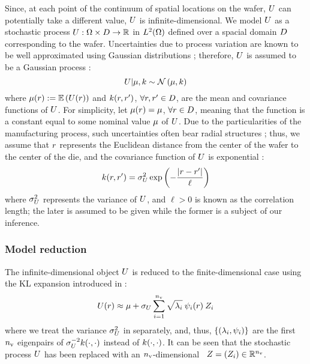 Since, at each point of the continuum of spatial locations on the wafer, $U$ can potentially take a different value, $U$ is infinite-dimensional. We model $U$ as a stochastic process $U: \Omega \times D \to \mathbb{R}$ in ${L^{2}(\Omega)}$ defined over a spacial domain $D$ corresponding to the wafer. Uncertainties due to process variation are known to be well approximated using Gaussian distributions \cite{srivastava2010}; therefore, $U$ is assumed to be a Gaussian process \cite{rasmussen2006}:
\[
  \U | \fMean, \fCov \sim \gaussian{\fMean}{\fCov}
\]
where $\fMean{\r} := \E{\U(\r)}$ and $\fCov{\r, \r'}$, $\forall r, r' \in D$, are the mean and covariance functions of $U$. For simplicity, let $\fMean{\r} = \fMean$, $\forall r \in D$, meaning that the function is a constant equal to some nominal value $\fMean$ of $U$. Due to the particularities of the manufacturing process, such uncertainties often bear radial structures \cite{cheng2011}; thus, we assume that $r$ represents the Euclidean distance from the center of the wafer to the center of the die, and the covariance function of $U$ is exponential \cite{maitre2010}:
\begin{equation} \elabel{covariance-function}
  \fCov{\r, \r'} = \sigma_\U^2 \exp\left(-\frac{\abs{\r - \r'}}{\ell}\right)
\end{equation}
where $\sigma_U^2$ represents the variance of $U$, and $\ell > 0$ is known as the correlation length; the later is assumed to be given while the former is a subject of our inference.

\subsubsection{Model reduction}
The infinite-dimensional object $U$ is reduced to the finite-dimensional case using the KL expansion introduced in :
\begin{equation} \elabel{kl-approximation}
  \U(\r) \approx \fMean + \sigma_\U \sum_{i = 1}^\nvars \sqrt{\lambda_i} \: \klb_i(\r) \: \Z_i
\end{equation}
where we treat the variance $\sigma^2_U$ in  separately, and, thus, $\{ (\lambda_i, \psi_i) \}$ are the first ${n_\text{v}}$ eigenpairs of $\sigma^{-2}_\U \fCov{\cdot, \cdot}$ instead of $\fCov{\cdot, \cdot}$. It can be seen that the stochastic process $U$ has been replaced with an ${n_\text{v}}$-dimensional \rv\ $Z = (Z_i) \in \mathbb{R}^{n_\text{v}}$.

